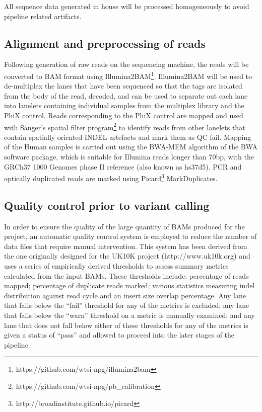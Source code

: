 
All sequence data generated in house will be processed homogeneously to avoid pipeline related artifacts.

\subsection{Alignment and preprocessing of reads}
Following generation of raw reads on the sequencing machine, the reads will be converted to BAM format using Illumina2BAM\footnote{https://github.com/wtsi-npg/illumina2bam}. Illumina2BAM will be used to de-multiplex the lanes that have been sequenced so that the tags are isolated from the body of the read, decoded, and can be used to separate out each lane into lanelets containing individual samples from the multiplex library and the PhiX control.  Reads corresponding to the PhiX control are mapped and used with Sanger’s spatial filter program\footnote{https://github.com/wtsi-npg/pb_calibration} to identify reads from other lanelets that contain spatially oriented INDEL artefacts and mark them as QC fail. Mapping  of the Human samples is carried out using the BWA-MEM algorithm of the BWA software package, which is suitable for Illumina reads longer than 70bp\cite{2013arXiv1303.3997L}, with the GRCh37 1000 Genomes phase II reference (also known as hs37d5). PCR and optically duplicated reads are marked using Picard\footnote{http://broadinstitute.github.io/picard} MarkDuplicates.

\subsection{Quality control prior to variant calling}
In order to ensure the quality of the large quantity of BAMs produced for the project, an automatic quality control system is employed to reduce the number of data files that require manual intervention. This system has been derived from the one originally designed for the UK10K  project (http://www.uk10k.org) and uses a series of empirically derived thresholds to assess summary metrics calculated from the input BAMs. These thresholds include: percentage of reads mapped; percentage of duplicate reads marked; various statistics measuring indel distribution against read cycle and an insert size overlap percentage. Any lane that falls below the “fail” threshold for any of the metrics is excluded; any lane that falls below the “warn” threshold on a metric is manually examined; and any lane that does not fall below either of these thresholds for any of the metrics is given a status of “pass” and allowed to proceed into the later stages of the pipeline.


